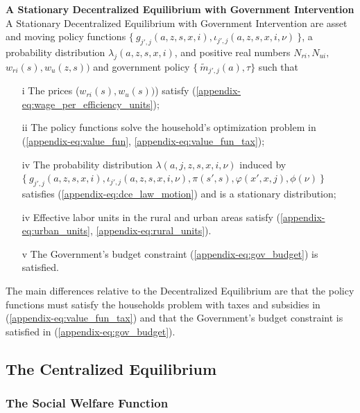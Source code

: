 \documentclass[12pt,pdftex]{article}
\begin{document}
\textbf{A Stationary Decentralized Equilibrium with Government Intervention} A Stationary Decentralized Equilibrium with Government Intervention are asset and moving policy functions $\{\ g_{j',j}(a, z, s, x, i), \iota_{j',j}(a, z, s, x, i, \nu) \ \}$, a probability distribution $\lambda_{j}(a, z, s, x, i)$, and positive real numbers $N_{ri}, N_{ui},$ $w_{ri}(s), w_{u}(z, s))$ and government policy $\{\ \tilde{m}_{j',j}(a), \tau\}$ such that
\begin{itemize}
\vspace{-.4cm}
\item[i] The prices ($w_{ri}(s), w_{u}(s))$) satisfy (\ref{appendix-eq:wage_per_efficiency_units});
\item[ii] The policy functions solve the household's optimization problem in (\ref{appendix-eq:value_fun}, \ref{appendix-eq:value_fun_tax});
\item[iv] The probability distribution $\lambda(a, j, z, s, x, i, \nu)$ induced by \\
$\{\ g_{j',j}(a, z, s, x, i), \iota_{j',j}(a, z, s, x, i, \nu), \pi(s',s), \varphi(x',x,j), \phi(\nu) \ \}$ satisfies (\ref{appendix-eq:dce_law_motion}) and is a stationary distribution;
\item[iv] Effective labor units in the rural and urban areas satisfy (\ref{appendix-eq:urban_units}, \ref{appendix-eq:rural_units}).
\item[v] The Government's budget constraint (\ref{appendix-eq:gov_budget}) is satisfied.
\end{itemize}
The main differences relative to the Decentralized Equilibrium are that the policy functions must satisfy the households problem with taxes and subsidies in (\ref{appendix-eq:value_fun_tax}) and that the Government's budget constraint is satisfied in (\ref{appendix-eq:gov_budget}).

\subsection{The Centralized Equilibrium}

\subsubsection{The Social Welfare Function}
\end{document}
